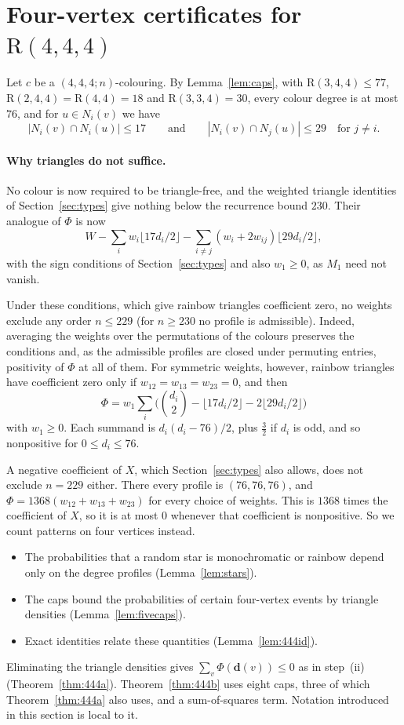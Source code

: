 \documentclass[11pt]{article}
\theoremstyle{spacedplain}
\theoremstyle{spaceddef}
\theoremstyle{spacedremark}
\newcommand{\R}{\mathrm{R}}
\begin{document}
\section{Four-vertex certificates for \texorpdfstring{$\R(4,4,4)$}{R(4,4,4)}}\label{sec:444}

Let $c$ be a $(4,4,4;n)$-colouring.
By Lemma~\ref{lem:caps}, with $\R(3,4,4)\le 77$, $\R(2,4,4)=\R(4,4)=18$ and $\R(3,3,4)=30$, every colour degree is at most $76$, and for $u\in N_i(v)$ we have
\[
|N_i(v)\cap N_i(u)|\le 17\qquad\text{and}\qquad|N_i(v)\cap N_j(u)|\le 29\quad\text{for } j\ne i.
\]

\paragraph{Why triangles do not suffice.}
No colour is now required to be triangle-free, and the weighted triangle identities of Section~\ref{sec:types} give nothing below the recurrence bound $230$.
Their analogue of $\Phi$ is now
\[
W-\sum_iw_i\lfloor 17d_i/2\rfloor-\sum_{i\ne j}(w_i+2w_{ij})\lfloor 29d_i/2\rfloor,
\]
with the sign conditions of Section~\ref{sec:types} and also $w_1\ge 0$, as $M_1$ need not vanish.

Under these conditions, which give rainbow triangles coefficient zero, no weights exclude any order $n\le 229$ (for $n\ge 230$ no profile is admissible).
Indeed, averaging the weights over the permutations of the colours preserves the conditions and, as the admissible profiles are closed under permuting entries, positivity of $\Phi$ at all of them.
For symmetric weights, however, rainbow triangles have coefficient zero only if $w_{12}=w_{13}=w_{23}=0$, and then
\[
\Phi=w_1\sum_i\big(\binom{d_i}2-\lfloor 17d_i/2\rfloor-2\lfloor 29d_i/2\rfloor\big)
\]
with $w_1\ge 0$.
Each summand is $d_i(d_i-76)/2$, plus $\frac32$ if $d_i$ is odd, and so nonpositive for $0\le d_i\le 76$.

A negative coefficient of $X$, which Section~\ref{sec:types} also allows, does not exclude $n=229$ either.
There every profile is $(76,76,76)$, and $\Phi=1368(w_{12}+w_{13}+w_{23})$ for every choice of weights.
This is $1368$ times the coefficient of $X$, so it is at most $0$ whenever that coefficient is nonpositive.
So we count patterns on four vertices instead.
\begin{itemize}
\item The probabilities that a random star is monochromatic or rainbow depend only on the degree profiles (Lemma~\ref{lem:stars}).
\item The caps bound the probabilities of certain four-vertex events by triangle densities (Lemma~\ref{lem:fivecaps}).
\item Exact identities relate these quantities (Lemma~\ref{lem:444id}).
\end{itemize}
Eliminating the triangle densities gives $\sum_v\Phi(\mathbf d(v))\le 0$ as in step~(ii) (Theorem~\ref{thm:444a}).
Theorem~\ref{thm:444b} uses eight caps, three of which Theorem~\ref{thm:444a} also uses, and a sum-of-squares term.
Notation introduced in this section is local to it.
\end{document}
